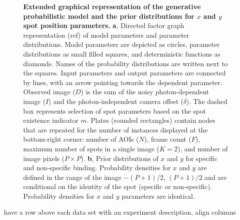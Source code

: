 \begin{figure} [t]
\caption{\textbf{Extended graphical representation of the generative probabilistic model and the prior distributions for $x$ and $y$ spot position parameters.} \textbf{a}, Directed factor graph representation (ref) of model parameters and parameter distributions. Model parameters are depicted as circles, parameter distributions as small filled squares, and deterministic functions as diamonds. Names of the probability distributions are written next to the squares. Input parameters and output parameters are connected by lines, with an arrow pointing towards the dependent parameter. Observed image ($D$) is the sum of the noisy photon-dependent image ($I$) and the photon-independent camera offset ($\delta$). The dashed box represents selection of spot parameters based on the spot existence indicator $m$. Plates (rounded rectangles) contain nodes that are repeated for the number of instances displayed at the bottom-right corner: number of AOIs ($N$), frame count ($F$), maximum number of spots in a single image ($K=2$), and number of image pixels ($P \times P$). \textbf{b}, Prior distributions of $x$ and $y$ for specific and non-specific binding. Probability densities for $x$ and $y$ are defined in the range of the image $-(P+1)/2$, $(P+1)/2$ and are conditional on the identity of the spot (specific or non-specific).  Probability densities for $x$ and $y$ parameters are identical. }
\end{figure}
have a row above each data set with an experiment description, align columns
\clearpage


